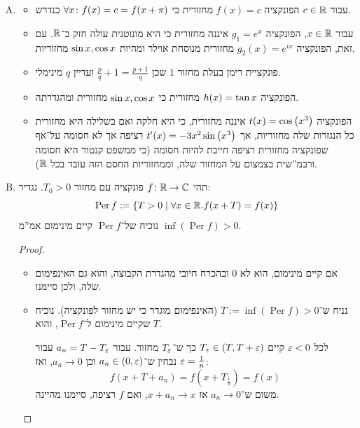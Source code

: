 \documentclass[]{../../../../tex/classes/homework}
\DeclareMathOperator\per{Per}
\begin{document}
	\section{}
	\begin{enumerate}[(A)]
		\item \begin{itemize}
			\item עבור $c \in \mathbb{R}$ הפונקציה $f(x) = c$ מחזורית כי $\forall x \colon f(x) = c = f(x  +\pi)$ כנדרש. 
			\item עבור $x \in \mathbb{R}$, הפונקציה $g_1 = e^{x}$ איננה מחזורית כי היא מונוטנית עולה חזק ב־$\mathbb{R}$. עם זאת, הפונקציה $g_2(x) = e^{ix}$ מחזורית מנוסחת אוילר ומהיות $\sin x, \cos x$ מחזוריות. 
			\item פונקציית רימן בעלת מחזור $1$ שכן $\frac{p}{q} + 1 = \frac{p + 1}{q}$ ועדיין $q$ מינימלי. 
			\item הפונקציה $h(x) = \tan x$ מחזורית כי $\sin x, \cos x$ מחזורית ומהגדרתה. 
			\item הפונקציה $t(x) = \cos\left ( x^{3} \right )$ איננה מחזורית, כי היא חלקה ואם בשלילה היא מחזורית כל הנגזרות שלה מחזוריות, אך $t'(x) = -3x^{2}\sin\left ( x^{3} \right )$ רציפה אך לא חסומה על־אף שפונקציה מחזורית רציפה חייבת להיות חסומה (כי ממשפט קנטור היא חסומה ורבמ''שית בצמצום על המחזור שלה, וממחזוריות החסם הזה עובד בכל $\mathbb{R}$). 
		\end{itemize}
		\item תהי $f \colon \mathbb{R}\to \mathbb{C}$ פונקציה עם מחזור $T_0 > 0$. נגדיר:
		\[ \per f := \{T > 0 \mid \forall x \in \R . f(x + T) = f(x)\} \]
		נוכיח של־$\per f$ קיים מינימום אמ''מ $\inf(\per f) > 0$. 
		\begin{proof}
			\begin{itemize}
				\item אם קיים מינימום, הוא לא $0$ ובהכרח חיובי מהגדרת הקבוצה, והוא גם האינפימום שלה, ולכן סיימנו. 
				\item נניח ש־$T := \inf(\per f) > 0$ (האינפימום מוגדר כי יש מחזור לפונקציה). נוכיח שקיים מינימום ל־$\per f$, והוא $T$. 
				
				
				לכל $\eg < 0$ קיים $  T_\eg \in (T, T +\eg)$ כך ש־$T_\eg$ מחזור. עבור $a_n = T - T_\eg$ עבור $\eg = \frac{1}{n}$ נבחין ש־$a_n \in (0, \eg)$ וכן $a_n \to 0$, ואז: 
				\[ f(x + T + a_n) = f(x + T_\frac{1}{n}) = f(x) \]
				משום ש־$a_n \to 0$ אז $x + a_n \to x$, ואם $f$ רציפה, סיימנו מהיינה. 
			\end{itemize}
		\end{proof}
	\end{enumerate}
	
\end{document}

